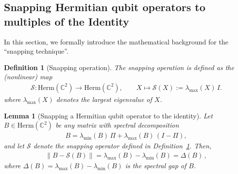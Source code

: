 \documentclass[11pt]{article}
\theoremstyle{plain}
\newtheorem{lemma}[theorem]{Lemma}
\newtheorem{definition}[theorem]{Definition}
\begin{document}
\subsection{Snapping Hermitian qubit operators to multiples of the Identity}

In this section, we formally introduce the mathematical background for the ``snapping technique''.

\begin{definition}[Snapping operation]\label{def:snapping-operator}
The snapping operation is defined as the (nonlinear) map
\begin{align}
\mathcal{S} : \mathrm{Herm}(\mathbb{C}^{2}) \rightarrow \mathrm{Herm}(\mathbb{C}^{2}), \quad\quad X \mapsto \mathcal{S}(X) := \lambda_{\max}(X)\, I.
\end{align}
where $\lambda_{\max}(X)$ denotes the largest eigenvalue of $X$. 
\end{definition}
\begin{lemma}[Snapping a Hermitian qubit operator to the identity]\label{lemma:snapping-hermitian-qubit-hermitian-operator}
Let $B \in \mathrm{Herm}(\mathbb{C}^{2})$ be any matrix with spectral decomposition
\begin{align}
B = \lambda_{\min}(B)\,\Pi + \lambda_{\max}(B)\,(I-\Pi),
\end{align}
and let $\mathcal{S}$ denote the snapping operator defined in Definition~\ref{def:snapping-operator}. Then,
\begin{align}
\|B - \mathcal{S}(B)\|
= \lambda_{\max}(B) - \lambda_{\min}(B) = \Delta(B) \, ,
\end{align}
where $\Delta(B) = \lambda_{\max}(B) - \lambda_{\min}(B)$ is the spectral gap of $B$.
\end{lemma}
\end{document}
